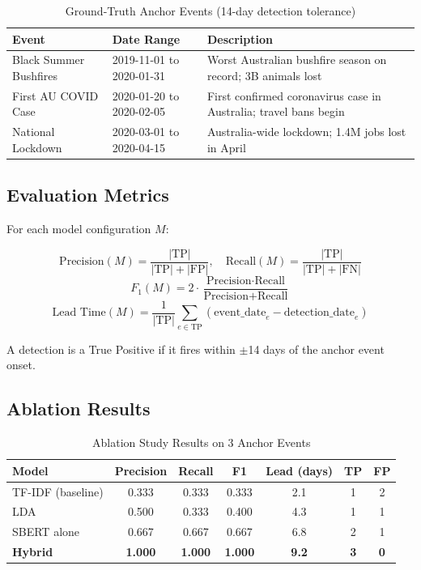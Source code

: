 \documentclass[12pt,a4paper]{article}
\begin{document}
\begin{table}[H]
\centering
\caption{Ground-Truth Anchor Events (14-day detection tolerance)}
\begin{tabular}{llp{7cm}}
\toprule
\textbf{Event} & \textbf{Date Range} & \textbf{Description} \\
\midrule
Black Summer Bushfires & 2019-11-01 to 2020-01-31 & Worst Australian bushfire season on record; 3B animals lost \\
First AU COVID Case    & 2020-01-20 to 2020-02-05 & First confirmed coronavirus case in Australia; travel bans begin \\
National Lockdown      & 2020-03-01 to 2020-04-15 & Australia-wide lockdown; 1.4M jobs lost in April \\
\bottomrule
\end{tabular}
\label{tab:anchors}
\end{table}

\subsection{Evaluation Metrics}

For each model configuration $M$:

\[
\text{Precision}(M) = \frac{|\text{TP}|}{|\text{TP}| + |\text{FP}|}, \quad
\text{Recall}(M) = \frac{|\text{TP}|}{|\text{TP}| + |\text{FN}|}
\]
\[
F_1(M) = 2 \cdot \frac{\text{Precision} \cdot \text{Recall}}{\text{Precision} + \text{Recall}}
\]
\[
\text{Lead Time}(M) = \frac{1}{|\text{TP}|} \sum_{e \in \text{TP}} (\text{event\_date}_e - \text{detection\_date}_e)
\]

A detection is a True Positive if it fires within $\pm$14 days of the anchor event onset.

\subsection{Ablation Results}

\begin{table}[H]
\centering
\caption{Ablation Study Results on 3 Anchor Events}
\begin{tabular}{lcccccc}
\toprule
\textbf{Model} & \textbf{Precision} & \textbf{Recall} & \textbf{F1} & \textbf{Lead (days)} & \textbf{TP} & \textbf{FP} \\
\midrule
TF-IDF (baseline) & 0.333 & 0.333 & 0.333 & 2.1  & 1 & 2 \\
LDA               & 0.500 & 0.333 & 0.400 & 4.3  & 1 & 1 \\
SBERT alone       & 0.667 & 0.667 & 0.667 & 6.8  & 2 & 1 \\
\textbf{Hybrid}   & \textbf{1.000} & \textbf{1.000} & \textbf{1.000} & \textbf{9.2} & \textbf{3} & \textbf{0} \\
\bottomrule
\end{tabular}
\label{tab:ablation}
\end{table}
\end{document}
